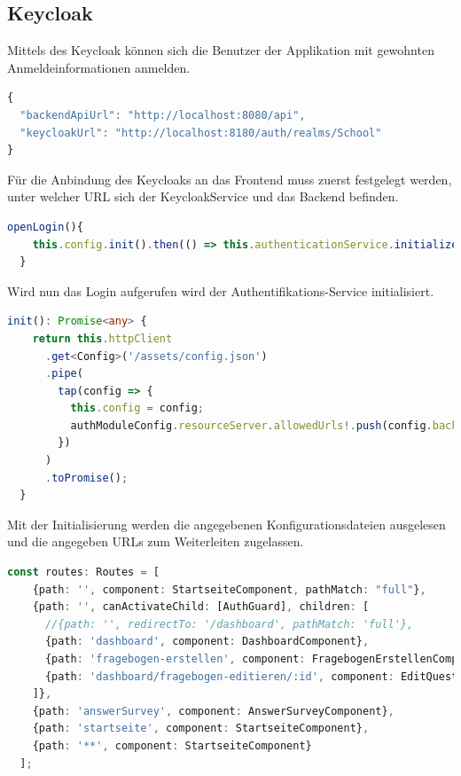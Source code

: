 \subsection{Keycloak}
Mittels des Keycloak können sich die Benutzer der Applikation mit gewohnten Anmeldeinformationen anmelden.
\begin{lstlisting}[language=TypeScript, caption=Konfiguration des Keycloaks, label=lst:Konfiguration-Keycloak]
{
  "backendApiUrl": "http://localhost:8080/api",
  "keycloakUrl": "http://localhost:8180/auth/realms/School"
}
\end{lstlisting}
Für die Anbindung des Keycloaks an das Frontend muss zuerst festgelegt werden, unter welcher URL sich der KeycloakService und das Backend befinden.
\newline
\newline
\begin{lstlisting}[language=TypeScript, caption=Aufrufen des Logins, label=lst:Initialisierung Login]
  openLogin(){
    this.config.init().then(() => this.authenticationService.initializeLogin())
  } 
\end{lstlisting}
Wird nun das Login aufgerufen wird der Authentifikations-Service initialisiert.
\newline
\newline
\begin{lstlisting}[language=TypeScript, caption=Initialisierung des AuthenticationService, label=lst:authenticationService]
  init(): Promise<any> {
    return this.httpClient
      .get<Config>('/assets/config.json')
      .pipe(
        tap(config => {
          this.config = config;
          authModuleConfig.resourceServer.allowedUrls!.push(config.backendApiUrl);
        })
      )
      .toPromise();
  }
\end{lstlisting}
Mit der Initialisierung werden die angegebenen Konfigurationsdateien ausgelesen und die angegeben URLs zum Weiterleiten zugelassen.
\newline
\newline
\begin{lstlisting}[language=TypeScript, caption=Aufrufen des Authentifikationswächters, label=lst:URLRouten]
  const routes: Routes = [
    {path: '', component: StartseiteComponent, pathMatch: "full"},
    {path: '', canActivateChild: [AuthGuard], children: [
      //{path: '', redirectTo: '/dashboard', pathMatch: 'full'},
      {path: 'dashboard', component: DashboardComponent},
      {path: 'fragebogen-erstellen', component: FragebogenErstellenComponent},
      {path: 'dashboard/fragebogen-editieren/:id', component: EditQuestionnaireComponent}
    ]},
    {path: 'answerSurvey', component: AnswerSurveyComponent},
    {path: 'startseite', component: StartseiteComponent},
    {path: '**', component: StartseiteComponent}
  ];
\end{lstlisting}
